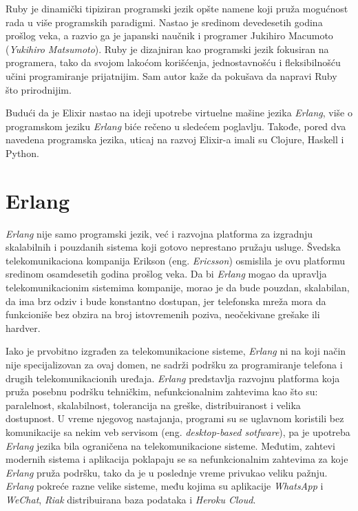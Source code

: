 \documentclass[12pt,oneside]{memoir}
\begin{document}
Ruby je dinamički tipiziran programski jezik opšte namene koji pruža mogućnost rada u više
programskih paradigmi. Nastao je sredinom devedesetih godina prošlog veka, a razvio ga je 
japanski naučnik i programer Jukihiro Macumoto (\emph{Yukihiro Matsumoto}). Ruby je dizajniran
kao programski jezik fokusiran na programera, tako da svojom lakoćom korišćenja, jednostavnošću i 
fleksibilnošću učini programiranje prijatnijim. Sam autor kaže da pokušava da napravi Ruby 
što prirodnijim.  

Budući da je Elixir nastao na ideji upotrebe virtuelne mašine jezika \emph{Erlang}, više o programskom jeziku \emph{Erlang} biće rečeno
u sledećem poglavlju. Takođe, pored dva navedena programska jezika, uticaj na razvoj Elixir-a 
imali su Clojure\cite{clojure}, Haskell\cite{haskell} i Python\cite{python}.

\section{Erlang}
\emph{Erlang} nije samo programski jezik, već i razvojna platforma za izgradnju skalabilnih i pouzdanih
sistema koji gotovo neprestano pružaju usluge. Švedska telekomunikaciona kompanija Erikson (eng.
\emph{Ericsson}) osmislila je ovu platformu sredinom  osamdesetih godina prošlog veka. 
Da bi \emph{Erlang} mogao da upravlja telekomunikacionim sistemima kompanije, morao
je da bude pouzdan, skalabilan, da ima brz odziv i bude konstantno dostupan, jer telefonska mreža
mora da funkcioniše bez obzira na broj istovremenih poziva, neočekivane grešake ili hardver.

Iako je prvobitno izgrađen za telekomunikacione sisteme, \emph{Erlang} ni na koji način nije 
specijalizovan za ovaj domen, ne sadrži podršku za programiranje telefona i drugih 
telekomunikacionih uređaja. \emph{Erlang} predstavlja razvojnu platforma koja pruža posebnu podršku
tehničkim, nefunkcionalnim zahtevima kao što su: paralelnost, skalabilnost, tolerancija na
greške, distribuiranost i velika dostupnost. U vreme njegovog nastajanja, programi su se uglavnom
koristili bez komunikacije sa nekim veb servisom (eng. \emph{desktop-based sotfware}), pa je 
upotreba \emph{Erlang} jezika bila ograničena na telekomunikacione sisteme. Međutim, zahtevi modernih 
sistema i aplikacija poklapaju se sa nefunkcionalnim zahtevima za koje \emph{Erlang} pruža podršku, tako
da je u poslednje vreme privukao veliku pažnju. \emph{Erlang} pokreće razne velike sisteme, među kojima
su aplikacije \emph{WhatsApp}\cite{whatsapp} i \emph{WeChat}\cite{wechat}, \emph{Riak}\cite{riak}  
distribuirana baza podataka i \emph{Heroku Cloud}\cite{heroku}.
\end{document}
